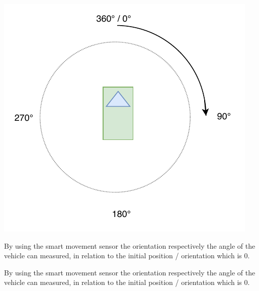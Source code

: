 \begin{minipage}{0.5\textwidth}
\centering
	\includegraphics[scale=0.6]{sources/mapping/orientation.pdf}
\end{minipage}
\begin{minipage}{0.5\textwidth}

By using the smart movement sensor the orientation respectively the angle of the vehicle can measured, in relation to the initial position / orientation which is 0\degree.

By using the smart movement sensor the orientation respectively the angle of the vehicle can measured, in relation to the initial position / orientation which is 0\degree.

\end{minipage}

